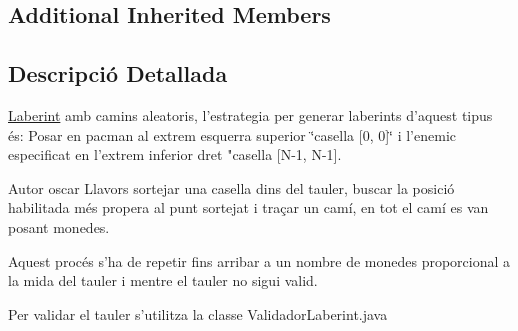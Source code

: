 \subsection*{Additional Inherited Members}


\subsection{Descripció Detallada}
\hyperlink{classlogica_1_1laberints_1_1_laberint}{Laberint} amb camins aleatoris, l'estrategia per generar laberints d'aquest tipus és\+: Posar en pacman al extrem esquerra superior \char`\"{}casella \mbox{[}0, 0\mbox{]}\char`\"{} i l'enemic especificat en l'extrem inferior dret "casella \mbox{[}N-\/1, N-\/1\mbox{]}. 

\begin{DoxyAuthor}{Autor}
oscar Llavors sortejar una casella dins del tauler, buscar la posició habilitada més propera al punt sortejat i traçar un camí, en tot el camí es van posant monedes.
\end{DoxyAuthor}
Aquest procés s'ha de repetir fins arribar a un nombre de monedes proporcional a la mida del tauler i mentre el tauler no sigui valid.

Per validar el tauler s'utilitza la classe Validador\+Laberint.\+java 

